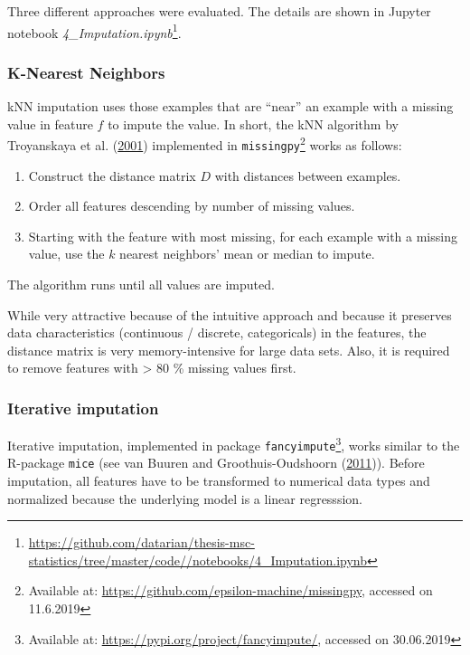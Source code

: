 \documentclass[
  11pt,
  a4paper,
  DIV=12,captions=tableheading,oneside,titlepage]{scrbook}
\providecommand{\tightlist}{%
  \setlength{\itemsep}{0pt}\setlength{\parskip}{0pt}}
\begin{document}
Three different approaches were evaluated. The details are shown in Jupyter notebook \emph{4\_Imputation.ipynb}\footnote{\url{https://github.com/datarian/thesis-msc-statistics/tree/master/code//notebooks/4_Imputation.ipynb}}.

\hypertarget{k-nearest-neighbors}{%
\subsubsection{K-Nearest Neighbors}\label{k-nearest-neighbors}}

kNN imputation uses those examples that are ``near'' an example with a missing value in feature \(f\) to impute the value. In short, the kNN algorithm by Troyanskaya et al. (\protect\hyperlink{ref-troyanskaya2001missing}{2001}) implemented in \texttt{missingpy}\footnote{Available at: \url{https://github.com/epsilon-machine/missingpy}, accessed on 11.6.2019} works as follows:

\begin{enumerate}
\def\labelenumi{\arabic{enumi}.}
\tightlist
\item
  Construct the distance matrix \(D\) with distances between examples.
\item
  Order all features descending by number of missing values.
\item
  Starting with the feature with most missing, for each example with a missing value, use the \(k\) nearest neighbors' mean or median to impute.
\end{enumerate}

The algorithm runs until all values are imputed.

While very attractive because of the intuitive approach and because it preserves data characteristics (continuous / discrete, categoricals) in the features, the distance matrix is very memory-intensive for large data sets. Also, it is required to remove features with \textgreater{} 80 \% missing values first.

\hypertarget{iterative-imputation}{%
\subsubsection{Iterative imputation}\label{iterative-imputation}}

Iterative imputation, implemented in package \texttt{fancyimpute}\footnote{Available at: \url{https://pypi.org/project/fancyimpute/}, accessed on 30.06.2019}, works similar to the R-package \texttt{mice} (see van Buuren and Groothuis-Oudshoorn (\protect\hyperlink{ref-buuren2011mice}{2011})). Before imputation, all features have to be transformed to numerical data types and normalized because the underlying model is a linear regresssion.
\end{document}
